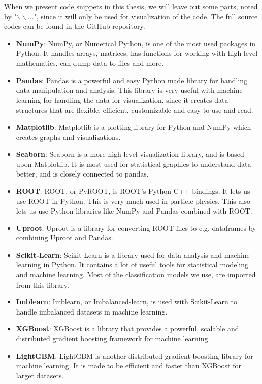 \documentclass[a4paper, american, 12pt]{report}
\begin{document}
	When we present code snippets in this thesis, we will leave out some parts, noted by "$\backslash\backslash$...", since it will only be used for visualization of the code. The full source codes can be found in the GitHub repository. 
	
	\begin{itemize}
		\item \textbf{NumPy}: NumPy, or Numerical Python, is one of the most used packages in Python. It handles arrays, matrices, has functions for working with high-level mathematics, can dump data to files and more.
		\item \textbf{Pandas}: Pandas is a powerful and easy Python made library for handling data manipulation and analysis. This library is very useful with machine learning for handling the data for visualization, since it creates data structures that are flexible, efficient, customizable and easy to use and read.
		\item \textbf{Matplotlib}: Matplotlib is a plotting library for Python and NumPy which creates graphs and visualizations.
		\item \textbf{Seaborn}: Seaborn is a more high-level visualization library, and is based upon Matplotlib. It is most used for statistical graphics to understand data better, and is closely connected to pandas. 
		\item \textbf{ROOT}: ROOT, or PyROOT, is ROOT's Python C++ bindings. It lets us use ROOT in Python. This is very much used in particle physics. This also lets us use Python libraries like NumPy and Pandas combined with ROOT.
		\item \textbf{Uproot}: Uproot is a library for converting ROOT files to e.g. dataframes by combining Uproot and Pandas.
		\item \textbf{Scikit-Learn}: Scikit-Learn is a library used for data analysis and machine learning in Python. It contains a lot of useful tools for statistical modeling and machine learning. Most of the classification models we use, are imported from this library.
		\item \textbf{Imblearn}: Imblearn, or Imbalanced-learn, is used with Scikit-Learn to handle imbalanced datasets in machine learning.
		\item \textbf{XGBoost}: XGBoost is a library that provides a powerful, scalable and distributed gradient boosting framework for machine learning.
		\item \textbf{LightGBM}: LightGBM is another distributed gradient boosting library for machine learning. It is made to be efficient and faster than XGBoost for larger datasets.
	\end{itemize}
	
\end{document}
